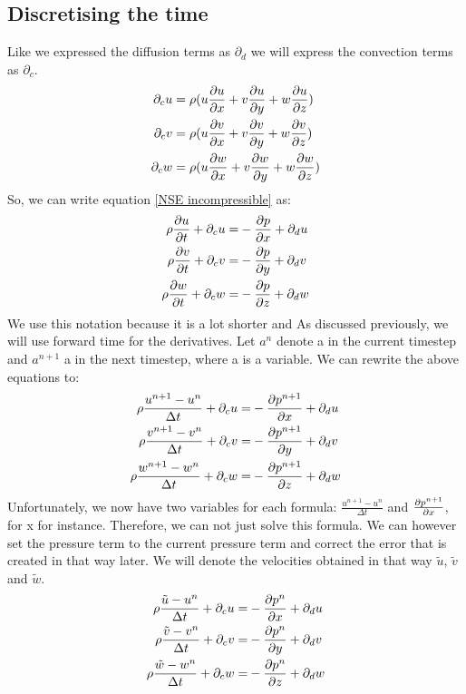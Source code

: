 \documentclass{article}
\begin{document}
\subsection{Discretising the time}
Like we expressed the diffusion terms as \(\partial _{d}\) we will express the convection terms as \(\partial _{c}\)\cite{MAC}.
\[
\begin{split}
  \partial _cu=\rho(&u\pdv{u}{x}+v\pdv{u}{y}+w\pdv{u}{z})\\
  \partial _cv=\rho(&u\pdv{v}{x}+v\pdv{v}{y}+w\pdv{v}{z})\\
  \partial _cw=\rho(&u\pdv{w}{x}+v\pdv{w}{y}+w\pdv{w}{z})
\end{split}
\]
So, we can write equation \ref{NSE incompressible} as\cite{MAC}:
\begin{equation}
\begin{split}
  \rho \pdv{u}{t} + \partial _cu=&-\pdv{p}{x}+\partial _du\\
  \rho \pdv{v}{t} + \partial _cv=&-\pdv{p}{y}+\partial _dv\\
  \rho \pdv{w}{t} + \partial _cw=&-\pdv{p}{z}+\partial _dw
\end{split}
\end{equation}\label{short NSE}
We use this notation because it is a lot shorter and As discussed previously, we will use forward time for the derivatives. Let \(a^n\) denote a in the current timestep and \(a^{n+1}\) a in the next timestep, where a is a variable. We can rewrite the above equations to: \cite{MAC}
\begin{equation}
\begin{split}
  \rho \frac{u^{n+1}-u^n}{\Delta t} + \partial _cu=&-\pdv{p^{n+1}}{x}+\partial _du\\
  \rho \frac{v^{n+1}-v^n}{\Delta t} + \partial _cv=&-\pdv{p^{n+1}}{y}+\partial _dv\\
  \rho \frac{w^{n+1}-w^n}{\Delta t} + \partial _cw=&-\pdv{p^{n+1}}{z}+\partial _dw
\end{split}
\end{equation} \label{time discretised NSE}
Unfortunately, we now have two variables for each formula: \(\frac{u^{n+1}-u^n}{\Delta t}\) and \(\pdv{p^{n+1}}{x}\), for x for instance. Therefore, we can not just solve this formula. We can however set the pressure term to the current pressure term and correct the error that is created in that way later. We will denote the velocities obtained in that way \(\tilde{u}\), \(\tilde{v}\) and \(\tilde{w}\)\cite{MAC}.
\begin{equation}
\begin{split}
  \rho \frac{\tilde{u}-u^n}{\Delta t} + \partial _cu=&-\pdv{p^{n}}{x}+\partial _du\\
  \rho \frac{\tilde{v}-v^n}{\Delta t} + \partial _cv=&-\pdv{p^{n}}{y}+\partial _dv\\
  \rho \frac{\tilde{w}-w^n}{\Delta t} + \partial _cw=&-\pdv{p^{n}}{z}+\partial _dw
\end{split}
\end{equation} \label{guess NSE}
\end{document}
